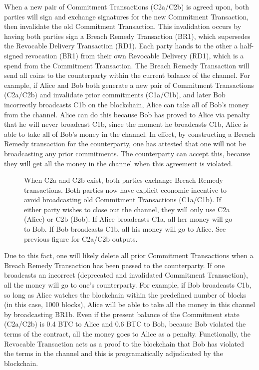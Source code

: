 \documentclass[letterpaper,11pt]{article}
\begin{document}
When a new pair of Commitment Transactions (C2a/C2b) is agreed upon, both
parties will sign and exchange signatures for the new Commitment Transaction,
then invalidate the old Commitment Transaction. This invalidation occurs by
having both parties sign a Breach Remedy Transaction (BR1), which supersedes the
Revocable Delivery Transaction (RD1). Each party hands to the other a
half-signed revocation (BR1) from their own Revocable Delivery (RD1), which is a
spend from the Commitment Transaction. The Breach Remedy Transaction will send
all coins to the counterparty within the current balance of the channel. For
example, if Alice and Bob both generate a new pair of Commitment Transactions
(C2a/C2b) and invalidate prior commitments (C1a/C1b), and later Bob incorrectly
broadcasts C1b on the blockchain, Alice can take all of Bob's money from the
channel. Alice can do this because Bob has proved to Alice via penalty that he
will never broadcast C1b, since the moment he broadcasts C1b, Alice is able to
take all of Bob's money in the channel. In effect, by constructing a Breach
Remedy transaction for the counterparty, one has attested that one will not be
broadcasting any prior commitments. The counterparty can accept this, because
they will get all the money in the channel when this agreement is violated.

\begin{figure}[H]
	\caption{
		When C2a and C2b exist, both parties exchange Breach Remedy
		transactions. Both parties now have explicit economic incentive
		to avoid broadcasting old Commitment Transactions (C1a/C1b).
		If either party wishes to close out the channel, they will only
		use C2a (Alice) or C2b (Bob). If Alice broadcasts C1a, all her
		money will go to Bob. If Bob broadcasts C1b, all his money will
		go to Alice. See previous figure for C2a/C2b outputs.
	}
\end{figure}

Due to this fact, one will likely delete all prior Commitment Transactions when
a Breach Remedy Transaction has been passed to the counterparty. If one
broadcasts an incorrect (deprecated and invalidated Commitment Transaction), all
the money will go to one's counterparty. For example, if Bob broadcasts C1b, so
long as Alice watches the blockchain within the predefined number of blocks (in
this case, 1000 blocks), Alice will be able to take all the money in this
channel by broadcasting BR1b. Even if the present balance of the Commitment
state (C2a/C2b) is 0.4 BTC to Alice and 0.6 BTC to Bob, because Bob violated the
terms of the contract, all the money goes to Alice as a penalty. Functionally,
the Revocable Transaction acts as a proof to the blockchain that Bob has
violated the terms in the channel and this is programatically adjudicated by the
blockchain.
\end{document}
